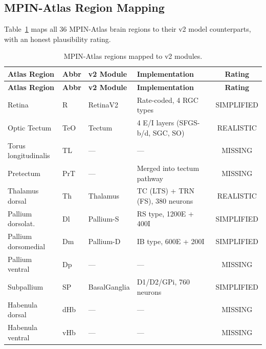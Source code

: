 \documentclass[11pt,a4paper]{article}
\begin{document}
\subsection{MPIN-Atlas Region Mapping}

Table~\ref{tab:atlas} maps all 36 MPIN-Atlas brain regions to their v2 model
counterparts, with an honest plausibility rating.

\begin{longtable}{@{}llllc@{}}
\caption{MPIN-Atlas regions mapped to v2 modules.}\label{tab:atlas}\\
\toprule
\textbf{Atlas Region} & \textbf{Abbr} & \textbf{v2 Module} & \textbf{Implementation} & \textbf{Rating} \\
\midrule
\endfirsthead
\toprule
\textbf{Atlas Region} & \textbf{Abbr} & \textbf{v2 Module} & \textbf{Implementation} & \textbf{Rating} \\
\midrule
\endhead
Retina               & R    & RetinaV2       & Rate-coded, 4 RGC types          & \textcolor{simplified}{SIMPLIFIED} \\
Optic Tectum         & TeO  & Tectum         & 4 E/I layers (SFGS-b/d, SGC, SO) & \textcolor{realistic}{REALISTIC}   \\
Torus longitudinalis & TL   & ---            & ---                              & \textcolor{missing}{MISSING}       \\
Pretectum            & PrT  & ---            & Merged into tectum pathway       & \textcolor{missing}{MISSING}       \\
Thalamus dorsal      & Th   & Thalamus       & TC (LTS) + TRN (FS), 380 neurons & \textcolor{realistic}{REALISTIC}   \\
Pallium dorsolat.    & Dl   & Pallium-S      & RS type, 1200E + 400I            & \textcolor{simplified}{SIMPLIFIED} \\
Pallium dorsomedial  & Dm   & Pallium-D      & IB type, 600E + 200I             & \textcolor{simplified}{SIMPLIFIED} \\
Pallium ventral      & Dp   & ---            & ---                              & \textcolor{missing}{MISSING}       \\
Subpallium           & SP   & BasalGanglia   & D1/D2/GPi, 760 neurons           & \textcolor{simplified}{SIMPLIFIED} \\
Habenula dorsal      & dHb  & ---            & ---                              & \textcolor{missing}{MISSING}       \\
Habenula ventral     & vHb  & ---            & ---                              & \textcolor{missing}{MISSING}       \\

\end{longtable}
\end{document}
